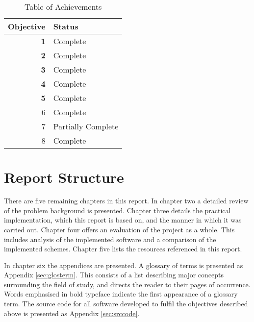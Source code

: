 \begin{table}[H]
    \centering
    \begin{tabular}{|r|l|}
        \hline
            \textbf{Objective} & \textbf{Status} \\
        \hline \hline
            \textbf{1} & Complete \\
            \textbf{2} & Complete \\
            \textbf{3} & Complete \\
            \textbf{4} & Complete \\
            \textbf{5} & Complete \\
        \hline
            6 & Complete \\
            7 & Partially Complete \\
            8 & Complete \\
        \hline
    \end{tabular}
    \label{tab:ach}
    \caption{Table of Achievements}
\end{table}

\section*{Report Structure}

There are five remaining chapters in this report. 
In chapter two a detailed review of the problem background is presented. 
Chapter three details the practical implementation, which this report is based on, and the manner in which it was carried out.
Chapter four offers an evaluation of the project as a whole. This includes analysis of the implemented software and a comparison of the implemented
schemes.
Chapter five lists the resources referenced in this report.

In chapter six the appendices are presented.
A glossary of terms is presented as Appendix \ref{sec:glosterm}. 
This consists of a list describing major concepts surrounding the field of study, and directs the reader to their pages of occurrence. 
Words emphasised in bold typeface indicate the first appearance of a glossary term.
The source code for all software developed to fulfil the objectives described above is presented as Appendix \ref{sec:srccode}.


